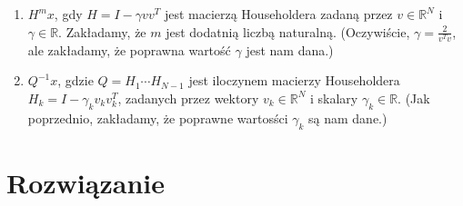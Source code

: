 \documentclass[a4paper]{article}
\newcommand{\R}{\mathbb R} %
\begin{document}
      \begin{enumerate}[label=(\alph*)]
         \item
            $H^{m}x$, gdy $H = I - \gamma vv^{T}$ jest macierzą Householdera zadaną przez
            $v \in \R^{N}$ i $\gamma \in \R$.
            Zakładamy, że $m$ jest dodatnią liczbą naturalną.
            (Oczywiście, $\gamma = \frac{2}{v^{T}v}$,
            ale zakładamy, że poprawna wartość $\gamma$ jest nam dana.)

         \item
            $Q^{-1} x$, gdzie $Q = H_{1} \cdots H_{N-1}$ jest iloczynem macierzy Householdera
            $H_{k} = I - \gamma_{k} v_{k} v_{k}^{T}$,
            zadanych przez wektory $v_{k} \in \R^{N}$ i skalary $\gamma_{k} \in \R$.
         (Jak poprzednio, zakładamy, że poprawne wartosści $\gamma_{k}$ są nam dane.)
      \end{enumerate}


   \section*{\large Rozwiązanie}
\end{document}
